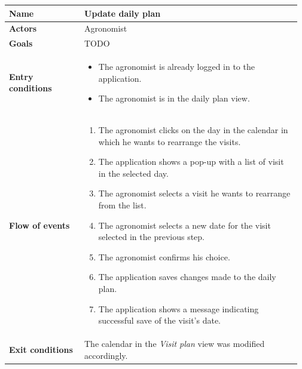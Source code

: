 \begin{table}[H]
    \centering
	\begin{tabular}{@{}p{0.25\linewidth} p{0.72\linewidth}@{}}
        \toprule
		\textbf{Name}               & Update daily plan\\
		\midrule
		\textbf{Actors}             & Agronomist\\
		\midrule
		\textbf{Goals}              & TODO \\
		\midrule
		
		\textbf{Entry conditions}   & \begin{itemize}[leftmargin=.4cm,noitemsep,topsep=0pt,before=\vspace{-3mm},after=\vspace{-4mm}]
		    \item The agronomist is already logged in to the application.
		    \item The agronomist is in the daily plan view.
		\end{itemize}\\
		\midrule
		
		\textbf{Flow of events}     & \begin{enumerate}[leftmargin=.4cm,noitemsep,topsep=0pt,before=\vspace{-3mm},after=\vspace{-4mm}]
		    \item The agronomist clicks on the day in the calendar in which he wants to rearrange the visits.
		    \item The application shows a pop-up with a list of visit in the selected day.
		    \item The agronomist selects a visit he wants to rearrange from the list.
		    \item The agronomist selects a new date for the visit selected in the previous step.
		    \item The agronomist confirms his choice.
		    \item The application saves changes made to the daily plan.
		    \item The application shows a message indicating successful save of the visit's date.
		\end{enumerate}\\
		\midrule
		\textbf{Exit conditions}    & The calendar in the \textit{Visit plan} view was modified accordingly. \\
		\midrule
		

\end{tabular}
\end{table}
